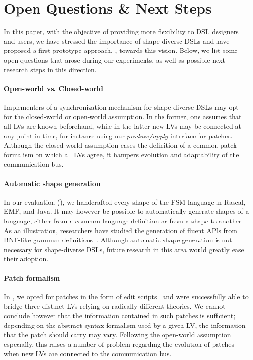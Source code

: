 \section{Open Questions \& Next Steps}
\label{sec:discussion}
In this paper, with the objective of providing more flexibility to DSL designers and users, we have stressed the importance of shape-diverse DSLs and have proposed a first prototype approach, \prism, towards this vision.
Below, we list some open questions that arose during our experiments, as well as possible next research steps in this direction.

\paragraph{Open-world vs. Closed-world}
Implementers of a synchronization mechanism for shape-diverse DSLs may opt for the closed-world or open-world assumption.
In the former, one assumes that all LVs are known beforehand, while in the latter new LVs may be connected at any point in time, for instance using our \emph{produce/apply} interface for patches.
Although the closed-world assumption eases the definition of a common patch formalism on which all LVs agree, it hampers evolution and adaptability of the communication bus.

\paragraph{Automatic shape generation}
In our evaluation (), we handcrafted every shape of the FSM language in Rascal, EMF, and Java.
It may however be possible to automatically generate shapes of a language, either from a common language definition or from a shape to another.
As an illustration, researchers have studied the generation of fluent APIs from BNF-like grammar definitions~\cite{nakamaru2017silverchain}.
Although automatic shape generation is not necessary for shape-diverse DSLs, future research in this area would greatly ease their adoption.

\paragraph{Patch formalism}
In \prism, we opted for patches in the form of edit scripts~\cite{rozen2017towards} and were successfully able to bridge three distinct LVs relying on radically different theories.
We cannot conclude however that the information contained in such patches is sufficient; depending on the abstract syntax formalism used by a given LV, the information that the patch should carry may vary.
Following the open-world assumption especially, this raises a number of problem regarding the evolution of patches when new LVs are connected to the communication bus.

